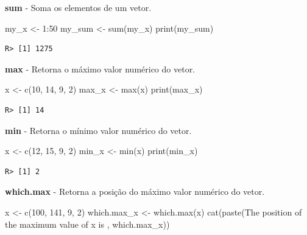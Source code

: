 \documentclass[
  11pt,
]{book}
\newenvironment{Shaded}{\begin{snugshade}}{\end{snugshade}}
\newcommand{\DecValTok}[1]{\textcolor[rgb]{0.06,0.06,0.06}{#1}}
\newcommand{\FunctionTok}[1]{\textcolor[rgb]{0,0,0}{#1}}
\newcommand{\NormalTok}[1]{#1}
\newcommand{\OtherTok}[1]{\textcolor[rgb]{0.37,0.37,0.37}{#1}}
\newcommand{\SpecialCharTok}[1]{\textcolor[rgb]{0,0,0}{#1}}
\newcommand{\StringTok}[1]{\textcolor[rgb]{0.5,0.5,0.5}{#1}}
\begin{document}
\textbf{sum} - Soma os elementos de um vetor.

\begin{Shaded}
\begin{Highlighting}[]
\NormalTok{my\_x }\OtherTok{\textless{}{-}} \DecValTok{1}\SpecialCharTok{:}\DecValTok{50}
\NormalTok{my\_sum }\OtherTok{\textless{}{-}} \FunctionTok{sum}\NormalTok{(my\_x)}
\FunctionTok{print}\NormalTok{(my\_sum)}
\end{Highlighting}
\end{Shaded}

\begin{verbatim}
R> [1] 1275
\end{verbatim}

\textbf{max} - Retorna o máximo valor numérico do vetor.

\begin{Shaded}
\begin{Highlighting}[]
\NormalTok{x }\OtherTok{\textless{}{-}} \FunctionTok{c}\NormalTok{(}\DecValTok{10}\NormalTok{, }\DecValTok{14}\NormalTok{, }\DecValTok{9}\NormalTok{, }\DecValTok{2}\NormalTok{)}
\NormalTok{max\_x }\OtherTok{\textless{}{-}} \FunctionTok{max}\NormalTok{(x)}
\FunctionTok{print}\NormalTok{(max\_x)}
\end{Highlighting}
\end{Shaded}

\begin{verbatim}
R> [1] 14
\end{verbatim}

\textbf{min} - Retorna o mínimo valor numérico do vetor.

\begin{Shaded}
\begin{Highlighting}[]
\NormalTok{x }\OtherTok{\textless{}{-}} \FunctionTok{c}\NormalTok{(}\DecValTok{12}\NormalTok{, }\DecValTok{15}\NormalTok{, }\DecValTok{9}\NormalTok{, }\DecValTok{2}\NormalTok{)}
\NormalTok{min\_x }\OtherTok{\textless{}{-}} \FunctionTok{min}\NormalTok{(x)}
\FunctionTok{print}\NormalTok{(min\_x)}
\end{Highlighting}
\end{Shaded}

\begin{verbatim}
R> [1] 2
\end{verbatim}

\textbf{which.max} - Retorna a posição do máximo valor numérico do vetor.

\begin{Shaded}
\begin{Highlighting}[]
\NormalTok{x }\OtherTok{\textless{}{-}} \FunctionTok{c}\NormalTok{(}\DecValTok{100}\NormalTok{, }\DecValTok{141}\NormalTok{, }\DecValTok{9}\NormalTok{, }\DecValTok{2}\NormalTok{)}
\NormalTok{which.max\_x }\OtherTok{\textless{}{-}} \FunctionTok{which.max}\NormalTok{(x)}
\FunctionTok{cat}\NormalTok{(}\FunctionTok{paste}\NormalTok{(}\StringTok{\textquotesingle{}The position of the maximum value of x is \textquotesingle{}}\NormalTok{, which.max\_x))}
\end{Highlighting}
\end{Shaded}
\end{document}
